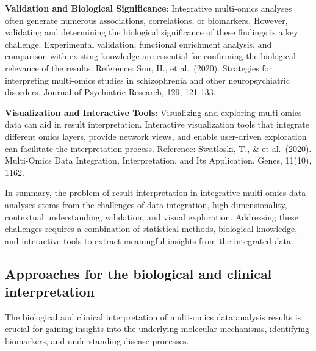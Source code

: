 \documentclass[a4paper, nobind]{templates/ociamthesis}
\begin{document}
\textbf{Validation and Biological Significance}: Integrative multi-omics analyses often generate numerous associations, correlations, or biomarkers. However, validating and determining the biological significance of these findings is a key challenge. Experimental validation, functional enrichment analysis, and comparison with existing knowledge are essential for confirming the biological relevance of the results. Reference: Sun, H., et al.~(2020). Strategies for interpreting multi-omics studies in schizophrenia and other neuropsychiatric disorders. Journal of Psychiatric Research, 129, 121-133.

\textbf{Visualization and Interactive Tools}: Visualizing and exploring multi-omics data can aid in result interpretation. Interactive visualization tools that integrate different omics layers, provide network views, and enable user-driven exploration can facilitate the interpretation process. Reference: Swatloski, T., \& et al.~(2020). Multi-Omics Data Integration, Interpretation, and Its Application. Genes, 11(10), 1162.

In summary, the problem of result interpretation in integrative multi-omics data analyses stems from the challenges of data integration, high dimensionality, contextual understanding, validation, and visual exploration. Addressing these challenges requires a combination of statistical methods, biological knowledge, and interactive tools to extract meaningful insights from the integrated data.

\hypertarget{approaches-for-the-biological-and-clinical-interpretation}{%
\subsection{Approaches for the biological and clinical interpretation}\label{approaches-for-the-biological-and-clinical-interpretation}}

The biological and clinical interpretation of multi-omics data analysis results is crucial for gaining insights into the underlying molecular mechanisms, identifying biomarkers, and understanding disease processes.
\end{document}

